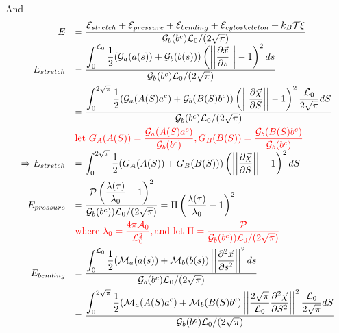 And
\[ \begin{array}{rl}
E  &=  \dfrac{\mathcal{E}_{stretch} + \mathcal{E}_{pressure} + \mathcal{E}_{bending} + \mathcal{E}_{cytoskeleton} + k_B\mathcal{T}  \xi}{\mathcal{G}_b(b^c) \mathcal{L}_0/(2\sqrt{\pi})}  \\[5pt]

E_{stretch} &= \dfrac{\displaystyle \int_0^{\mathcal{L}_0} \dfrac{1}{2} (\mathcal{G}_a(a(s)) +\mathcal{G}_b(b(s)) )\left( \left |\left| \dfrac{\partial \vec{x} }{\partial s} \right|\right| - 1\right)^2 ds}{\mathcal{G}_b(b^c)\mathcal{L}_0/(2\sqrt{\pi})} \\[10pt]

&= \dfrac{\displaystyle \int_0^{2 \sqrt{\pi}} \dfrac{1}{2} (\mathcal{G}_a(A(S)a^c) +\mathcal{G}_b(B(S)b^c) )\left( \left |\left|  \dfrac{\partial \vec{\chi} }{\partial S} \right|\right| - 1\right)^2 \dfrac{\mathcal{L}_0}{2\sqrt{\pi}} dS}{\mathcal{G}_b(b^c) \mathcal{L}_0/(2\sqrt{\pi})} \\[10pt]

 & \textcolor{red}{\text{let } G_A(A(S)) = \dfrac{ \mathcal{G}_a(A(S)a^c)}{\mathcal{G}_b(b^c)}, G_B(B(S)) = \dfrac{ \mathcal{G}_b(B(S)b^c) }{\mathcal{G}_b(b^c)}}\\
 
\Rightarrow E_{stretch} &= \displaystyle \int_0^{2 \sqrt{\pi}} \dfrac{1}{2} (G_A(A(S))+ G_B(B(S)))\left( \left |\left|  \dfrac{\partial \vec{\chi} }{\partial S} \right|\right| - 1\right)^2  dS \\[10pt]
 
E_{pressure}  &= \dfrac{\mathcal{P} \left( \dfrac{\lambda(\tau)}{\lambda_0} -1\right)^2}{\mathcal{G}_b(b^c)) \mathcal{L}_0/(2\sqrt{\pi})}  = \Pi \left(\dfrac{\lambda(\tau)}{\lambda_0} -1\right)^2 \\[10pt]

 & \textcolor{red}{\text{where } \lambda_0 = \dfrac{4 \pi \mathcal{A}_0}{\mathcal{L}_0^2},\text{and let } \Pi = \dfrac{\mathcal{P} }{\mathcal{G}_b(b^c)) \mathcal{L}_0/(2\sqrt{\pi})}}\\[10pt]
 
E_{bending} &= \dfrac{\displaystyle\int_0^{\mathcal{L}_0} \dfrac{1}{2 } (\mathcal{M}_a(a(s)) + \mathcal{M}_b (b(s)) \left|\left| \dfrac{\partial^2 \vec{x}}{\partial s^2} \right|\right|^2 ds}{\mathcal{G}_b(b^c) \mathcal{L}_0/(2\sqrt{\pi})}\\[10pt]

&= \dfrac{\displaystyle\int_0^{2\sqrt{\pi}} \dfrac{1}{2 } (\mathcal{M}_a(A(S)a^c) + \mathcal{M}_b (B(S)b^c) \left|\left| \dfrac{2 \sqrt{\pi}}{\mathcal{L}_0}\dfrac{\partial^2 \vec{\chi}}{\partial S^2} \right|\right|^2 \dfrac{\mathcal{L}_0}{2\sqrt{\pi}} dS}{\mathcal{G}_b(b^c) \mathcal{L}_0/(2\sqrt{\pi})}\\[10pt]


\end{array}\]
